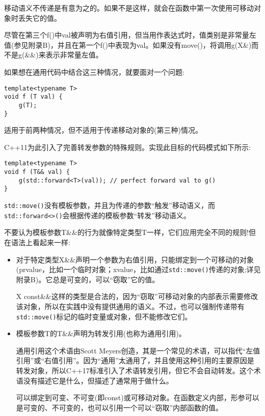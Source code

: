 \begin{tcolorbox}[colback=webgreen!5!white,colframe=webgreen!75!black]
\hspace*{0.75cm}移动语义不传递是有意为之的。如果不是这样，就会在函数中第一次使用可移动对象时丢失它的值。
\end{tcolorbox}

尽管在第三个f()中val被声明为右值引用，但当用作表达式时，值类别是非常量左值(参见附录B)，并且在第一个f()中表现为val。如果没有move()，将调用g(X\&)而不是g(\&\&)来表示非常量左值。

如果想在通用代码中结合这三种情况，就要面对一个问题:

\begin{lstlisting}[style=styleCXX]
template<typename T>
void f (T val) {
	g(T);
}
\end{lstlisting}

适用于前两种情况，但不适用于传递移动对象的(第三种)情况。

C++11为此引入了完善转发参数的特殊规则。实现此目标的代码模式如下所示:

\begin{lstlisting}[style=styleCXX]
template<typename T>
void f (T&& val) {
	g(std::forward<T>(val)); // perfect forward val to g()
}
\end{lstlisting}

\texttt{std::move()}没有模板参数，并且为传递的参数“触发”移动语义，而\texttt{std::forward<>()}会根据传递的模板参数“转发”移动语义。

不要认为模板参数T\&\&的行为就像特定类型T一样，它们应用完全不同的规则!但在语法上看起来一样:

\begin{itemize}
\item 
对于特定类型X\&\&声明一个参数为右值引用，只能绑定到一个可移动的对象(prvalue，比如一个临时对象；xvalue，比如通过\texttt{std::move()}传递的对象;详见附录B)。它总是可变的，可以“窃取”它的值。

\begin{tcolorbox}[colback=webgreen!5!white,colframe=webgreen!75!black]
\hspace*{0.75cm}X const\&\&这样的类型是合法的，因为“窃取”可移动对象的内部表示需要修改该对象，所以在实践中没有提供通用的语义。不过，也可以强制传递带有\texttt{std::move()}标记的临时变量或对象，但不能修改它们。
\end{tcolorbox}

\item 
模板参数T的T\&\&声明为转发引用(也称为通用引用)。

\begin{tcolorbox}[colback=webgreen!5!white,colframe=webgreen!75!black]
\hspace*{0.75cm}通用引用这个术语由Scott Meyers创造，其是一个常见的术语，可以指代“左值引用”或“右值引用”。因为“通用”太通用了，并且使用这种引用的主要原因是转发对象，所以C++17标准引入了术语转发引用，但它不会自动转发。这个术语没有描述它是什么，但描述了通常用于做什么。
\end{tcolorbox}

可以绑定到可变、不可变(即const)或可移动对象。在函数定义内部，形参可以是可变的、不可变的，也可以引用一个可以“窃取”内部函数的值。
\end{itemize}

